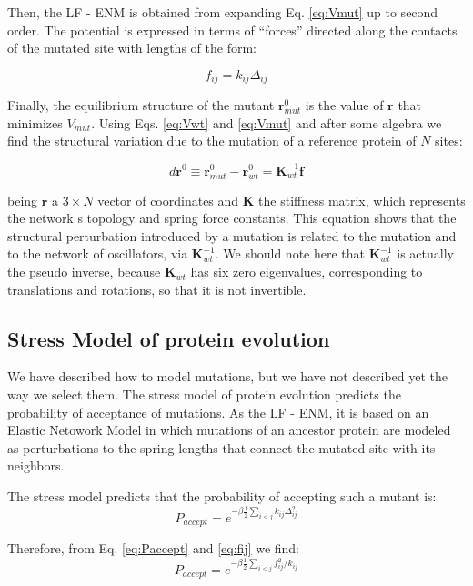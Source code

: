 \documentclass{article}
\begin{document}
\begin{multicols}{2}
{{Then, the LF - ENM is obtained from expanding Eq. \ref{eq:Vmut} up to second order. The potential is expressed in terms of ``forces'' directed along the contacts of the mutated site with lengths of the form:

\begin{equation} \label{eq:fij}
f_{ij} = k_{ij} \Delta_{ij}
\end{equation}

Finally, the equilibrium structure of the mutant $\mathbf{r}^{0}_{mut}$ is the value of $\mathbf{r}$ that minimizes $V_{mut}$. Using Eqs. \ref{eq:Vwt} and \ref{eq:Vmut} and after some algebra we find the structural variation due to the mutation of a reference protein of $N$ sites:

\begin{equation} \label{eq:dr}
d\mathbf{r}^{0} \equiv  \mathbf{r}^{0}_{mut} - \mathbf{r}^{0}_{wt} = \mathbf{K}^{-1}_{wt}\mathbf{f}
\end{equation}

being $\mathbf{r}$ a $3 \times N $ vector of coordinates and $\mathbf{K}$ the stiffness matrix, which represents
the network s topology and spring force constants. This equation shows that the structural perturbation introduced by a mutation is related to the mutation and to the network of oscillators, via $\mathbf{K}^{-1}_{wt}$. We should note here that $\mathbf{K}^{-1}_{wt}$ is actually the pseudo inverse, because $\mathbf{K}_{wt}$ has six zero eigenvalues, corresponding to translations and rotations, so that it is not invertible.

\subsection*{Stress Model of protein evolution}
We have described how to model mutations, but we have not described yet the way we select them. The stress model of protein evolution predicts the probability of acceptance of mutations. As the LF - ENM, it is based on an Elastic Netowork Model in which mutations of an ancestor protein are modeled as perturbations to the spring lengths that connect the mutated site with its neighbors.

The stress model predicts that the probability of accepting such a mutant is:
\begin{equation} \label{eq:Paccept}
P_{accept} = e^{-\beta \frac{1}{2} \sum_{i<j} k_{ij} \Delta_{ij}^2}
\end{equation}

Therefore, from Eq. \ref{eq:Paccept} and \ref{eq:fij} we find:
\begin{equation} \label{eq:PacceptFij}
P_{accept} = e^{-\beta \frac{1}{2} \sum_{i<j}  f_{ij}^2/k_{ij}}
\end{equation}

}}
\end{multicols}
\end{document}
